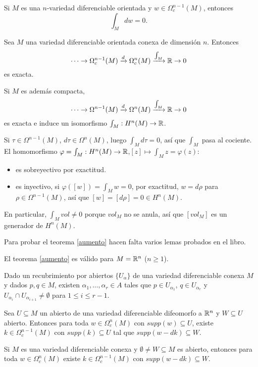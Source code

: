 \documentclass[CV.tex]{subfiles}
\begin{document}
\begin{coro}
Si $M$ es una $n$-variedad diferenciable orientada y $w\in \Omega_c^{n-1}(M)$, entonces
\[
\int_M dw=0.
\]
\end{coro}

\begin{teorema}\label{aumento}
Sea $M$ una variedad diferenciable orientada conexa de dimensión $n$. Entonces
\[
\cdots\to\Omega_c^{n-1}(M)\xrightarrow{d}\Omega_c^{n}(M)\xrightarrow{\int_M}\mathbb{R}\to 0
\]
es exacta.
\end{teorema}

\begin{coro}
Si $M$ es además compacta, 
\[
\cdots\to\Omega^{n-1}(M)\xrightarrow{d}\Omega^{n}(M)\xrightarrow{\int_M}\mathbb{R}\to 0
\]
es exacta e induce un isomorfismo $\int_M:H^n(M)\to\mathbb{R}$. 
\end{coro}
\begin{dem}
Si $\tau\in\Omega^{n-1}(M)$, $d\tau\in\Omega^n(M)$, luego $\int_M d\tau=0$, así que $\int_M$ pasa al cociente.  El homomorfismo $\varphi=\int_M:H^n(M)\to\mathbb{R}$,$[z]\mapsto \int_M z=\varphi(z)$:
\begin{itemize}
\item es sobreyectivo por exactitud.
\item es inyectivo, si $\varphi([w])=\int_M w=0$, por exactitud, $w=d\rho$ para $\rho\in\Omega^{n-1}(M)$, así que $[w]=[d\rho]=0\in H^n(M)$.
\end{itemize}
\QED
\end{dem}

En particular, $\int_M vol\neq 0$ porque $vol_M$ no se anula, así que $[vol_M]$ es un generador de $H^n(M)$. 

Para probar el teorema \ref{aumento} hacen falta varios lemas probados en el libro.
\begin{lemma}\label{A}
El teorema \ref{aumento} es válido para $M=\mathbb{R}^n$ ($n\geq 1$).
\end{lemma}
\begin{lemma}
Dado un recubrimiento por abiertos $\{U_{\alpha}\}$ de una variedad diferenciable conexa $M$ y dados $p,q\in M$, existen $\alpha_1,\dots, \alpha_r\in A$ tales que $p\in U_{\alpha_1}$, $q\in U_{\alpha_r}$ y $U_{\alpha_i}\cap U_{\alpha_{i+1}}\neq\emptyset$ para $1\leq i\leq r-1$.
\end{lemma}
\begin{lemma}
Sea $U\subseteq M$ un abierto de una variedad diferenciable difeomorfo a $\mathbb{R}^n$ y $W\subseteq U$ abierto. Entonces para toda $w\in\Omega_c^n(M)$ con $supp(w)\subseteq U$, existe $k\in\Omega_c^{n-1}(M)$  con $supp(k)\subseteq U$ tal que $supp(w-dk)\subseteq W$. 
\end{lemma}
\begin{lemma}\label{D}
Si $M$ es una variedad diferenciable conexa y $\emptyset\neq W\subseteq M$ es abierto, entonces para toda $w\in\Omega_c^n(M)$ existe $k\in\Omega_c^{n-1}(M)$ con $supp(w-dk)\subseteq W$. 
\end{lemma}
\end{document}
